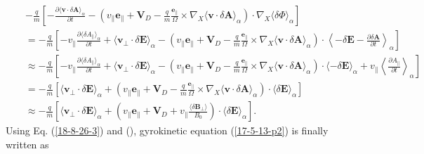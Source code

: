 \documentclass{llncs}
\begin{document}
\begin{eqnarray}
  &  & - \frac{q}{m} \left[ - \frac{\partial \langle \mathbf{v} \cdot \delta
  \mathbf{A} \rangle_{\alpha}}{\partial t} - \left( v_{\parallel}
  \mathbf{e}_{\parallel} +\mathbf{V}_D - \frac{q}{m} 
  \frac{\mathbf{e}_{\parallel}}{\Omega} \times \nabla_X \langle \mathbf{v}
  \cdot \delta \mathbf{A} \rangle_{\alpha} \right) \cdot \nabla_X \langle
  \delta \Phi \rangle_{\alpha} \right] \nonumber\\
  &  & = - \frac{q}{m} \left[ - v_{\parallel} \frac{\partial \langle \delta
  A_{\parallel} \rangle_{\alpha}}{\partial t} + \langle \mathbf{v}_{\perp}
  \cdot \delta \mathbf{E} \rangle_{\alpha} - \left( v_{\parallel}
  \mathbf{e}_{\parallel} +\mathbf{V}_D - \frac{q}{m} 
  \frac{\mathbf{e}_{\parallel}}{\Omega} \times \nabla_X \langle \mathbf{v}
  \cdot \delta \mathbf{A} \rangle_{\alpha} \right) \cdot \left\langle - \delta
  \mathbf{E}- \frac{\partial \delta \mathbf{A}}{\partial t}
  \right\rangle_{\alpha} \right] \nonumber\\
  &  & \approx - \frac{q}{m} \left[ - v_{\parallel} \frac{\partial \langle
  \delta A_{\parallel} \rangle_{\alpha}}{\partial t} + \langle
  \mathbf{v}_{\perp} \cdot \delta \mathbf{E} \rangle_{\alpha} - \left(
  v_{\parallel} \mathbf{e}_{\parallel} +\mathbf{V}_D - \frac{q}{m} 
  \frac{\mathbf{e}_{\parallel}}{\Omega} \times \nabla_X \langle \mathbf{v}
  \cdot \delta \mathbf{A} \rangle_{\alpha} \right) \cdot \langle - \delta
  \mathbf{E} \rangle_{\alpha} + v_{\parallel} \left\langle \frac{\partial
  A_{\parallel}}{\partial t} \right\rangle_{\alpha} \right] \nonumber\\
  &  & = - \frac{q}{m} \left[ \langle \mathbf{v}_{\perp} \cdot \delta
  \mathbf{E} \rangle_{\alpha} + \left( v_{\parallel} \mathbf{e}_{\parallel}
  +\mathbf{V}_D - \frac{q}{m}  \frac{\mathbf{e}_{\parallel}}{\Omega} \times
  \nabla_X \langle \mathbf{v} \cdot \delta \mathbf{A} \rangle_{\alpha} \right)
  \cdot \langle \delta \mathbf{E} \rangle_{\alpha} \right] \nonumber\\
  &  & \approx - \frac{q}{m} \left[ \langle \mathbf{v}_{\perp} \cdot \delta
  \mathbf{E} \rangle_{\alpha} + \left( v_{\parallel} \mathbf{e}_{\parallel}
  +\mathbf{V}_D + v_{\parallel} \frac{\langle \delta \mathbf{B}_{\perp}
  \rangle}{B_0} \right) \cdot \langle \delta \mathbf{E} \rangle_{\alpha}
  \right] .  \label{18-8-26-3}
\end{eqnarray}
Using Eq. (\ref{18-8-26-3}) and (), gyrokinetic equation (\ref{17-5-13-p2}) is
finally written as
\end{document}
